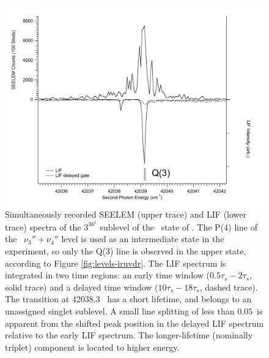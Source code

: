 \documentclass[12pt]{mitthesis}
\begin{document}
\begin{figure}
  \caption{Simultaneously recorded SEELEM (upper trace) and LIF (lower
    trace) spectra of the $3^36^1$  sublevel of the \astate\
    state of .  The P(4) line of the \xstate\ $\nu_3'' +
    \nu_4''$ level is used as an intermediate state in the experiment,
    so only the Q(3) line is observed in the upper state, according to
    Figure \ref{fig:levels-iruvdr}.  The LIF spectrum is integrated in
    two time regions: an early time window ($0.5\tau_s-2\tau_s$, solid
    trace) and a delayed time window ($10\tau_s-18\tau_s$, dashed
    trace).  The transition at 42038.3 \rcm\ has a short lifetime, and
    belongs to an unassigned singlet sublevel.  A small line splitting
    of less than $0.05$\rcm\ is apparent from the shifted peak
    position in the delayed LIF spectrum relative to the early LIF
    spectrum.  The longer-lifetime (nominally triplet) component is
    located to higher energy.}
  \label{fig:3361-q3}
  \centering
  \includegraphics[width=6in]{spectrum-3361-q3-split.pdf}
\end{figure}
\end{document}
